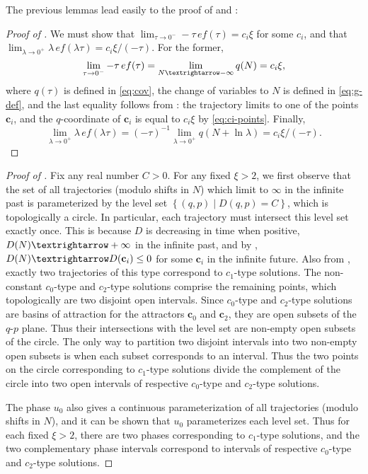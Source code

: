 The previous lemmas lead easily to the proof of  and :
\begin{proof}[Proof of ]
\label{pf:bg-future} We must show that $\lim_{\tau\to0^{-}}-\tau\,ef(\tau)=c_{i}\xi$ for some $c_{i}$, and that $\lim_{\lambda\to0^{+}}\lambda\,ef(\lambda\tau)=c_{i}\xi/(-\tau)$. For the former, 
\[
\lim_{\tau\to0^{-}}-\tau\,ef(\tau)=\lim_{N\textrightarrow-\infty}q(N)=c_{i}\xi,
\]
 where $q(\tau)$ is defined in \eqref{eq:cov}, the change of variables to $N$ is defined in \eqref{eq:g-def}, and the last equality follows from : the trajectory limits to one of the points $\mathbf{c}_{i}$, and the $q$-coordinate of $\mathbf{c}_{i}$ is equal to $c_{i}\xi$ by \eqref{eq:ci-points}. Finally, 
\[
\lim_{\lambda\to0^{+}}\lambda\,ef(\lambda\tau)=(-\tau)^{-1}\lim_{\lambda\to0^{+}}q(N+\ln\lambda)=c_{i}\xi/(-\tau).
\]
 
\end{proof}
%
\begin{proof}[Proof of ]
 Fix any real number $C>0$. For any fixed $\xi>2$, we first observe that the set of all trajectories (modulo shifts in $N$) which limit to $\bm{\infty}$ in the infinite past is parameterized by the level set $\left\{ (q,p)\mid D(q,p)=C\right\} $, which is topologically a circle. In particular, each trajectory must intersect this level set exactly once. This is because $D$ is decreasing in time when positive, $D(N)\textrightarrow+\infty$ in the infinite past, and by , $D(N)\textrightarrow D(\mathbf{c}_{i})\leq0$ for some $\mathbf{c}_{i}$ in the infinite future. Also from , exactly two trajectories of this type correspond to $c_{1}$\nobreakdash-type solutions. The non-constant $c_{0}$\nobreakdash-type and $c_{2}$\nobreakdash-type solutions comprise the remaining points, which topologically are two disjoint open intervals. Since $c_{0}$\nobreakdash-type and $c_{2}$\nobreakdash-type solutions are basins of attraction for the attractors $\mathbf{c}_{0}$ and $\mathbf{c}_{2}$, they are open subsets of the $q$-$p$ plane. Thus their intersections with the level set are non-empty open subsets of the circle. The only way to partition two disjoint intervals into two non-empty open subsets is when each subset corresponds to an interval. Thus the two points on the circle corresponding to $c_{1}$\nobreakdash-type solutions divide the complement of the circle into two open intervals of respective $c_{0}$\nobreakdash-type and $c_{2}$\nobreakdash-type solutions. 

The phase $u_{0}$ also gives a continuous parameterization of all trajectories (modulo shifts in $N$), and it can be shown that $u_{0}$ parameterizes each level set. Thus for each fixed $\xi>2$, there are two phases corresponding to $c_{1}$\nobreakdash-type solutions, and the two complementary phase intervals correspond to intervals of respective $c_{0}$\nobreakdash-type and $c_{2}$\nobreakdash-type solutions.
\end{proof}

